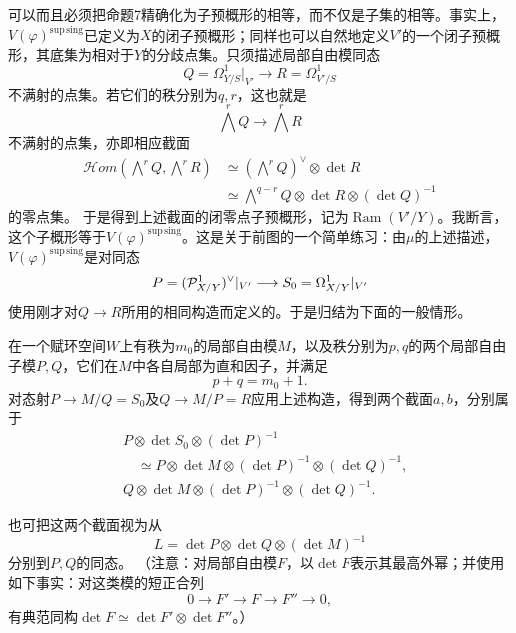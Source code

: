 可以而且必须把命题7精确化为子预概形的相等，而不仅是子集的相等。事实上，$V(\varphi)^{\mathrm{sup\,sing}}$已定义为$X$的闭子预概形；同样也可以自然地定义$V'$的一个闭子预概形，其底集为相对于$Y$的分歧点集。只须描述局部自由模同态
\[
 Q=\Omega^1_{Y/S}|_{V'}\longrightarrow R=\Omega^1_{V'/S}
\]
不满射的点集。若它们的秩分别为$q,r$，这也就是
\[
 \bigwedge^r Q\longrightarrow\bigwedge^r R
\]
不满射的点集，亦即相应截面
\begin{align*}
 \mathscr Hom(\bigwedge^r Q,\bigwedge^r R)
 &\simeq(\bigwedge^r Q)^\vee\otimes\det R\\
 &\simeq\bigwedge^{q-r}Q\otimes\det R\otimes(\det Q)^{-1}
\end{align*}
的零点集。
于是得到上述截面的闭零点子预概形，记为$\operatorname{Ram}(V'/Y)$。我断言，这个子概形等于$V(\varphi)^{\mathrm{sup\,sing}}$。这是关于前图的一个简单练习：由$\mu$的上述描述，$V(\varphi)^{\mathrm{sup\,sing}}$是对同态
\[
 P=(\mathcal P^1_{X/Y})^\vee|_{V'}\longrightarrow
 S_0=\Omega^1_{X/Y}|_{V'}
\]
使用刚才对$Q\to R$所用的相同构造而定义的。于是归结为下面的一般情形。

在一个赋环空间$W$上有秩为$m_0$的局部自由模$M$，以及秩分别为$p,q$的两个局部自由子模$P,Q$，它们在$M$中各自局部为直和因子，并满足
\[
 p+q=m_0+1.
\]
对态射$P\to M/Q=S_0$及$Q\to M/P=R$应用上述构造，得到两个截面$a,b$，分别属于
\begin{align*}
 &P\otimes\det S_0\otimes(\det P)^{-1}\\
 &\quad\simeq P\otimes\det M\otimes(\det P)^{-1}\otimes(\det Q)^{-1},\\
 &Q\otimes\det M\otimes(\det P)^{-1}\otimes(\det Q)^{-1}.
\end{align*}

也可把这两个截面视为从
\[
 L=\det P\otimes\det Q\otimes(\det M)^{-1}
\]
分别到$P,Q$的同态。
（注意：对局部自由模$F$，以$\det F$表示其最高外幂；并使用如下事实：对这类模的短正合列
\[
 0\longrightarrow F'\longrightarrow F\longrightarrow F''\longrightarrow0,
\]
有典范同构$\det F\simeq\det F'\otimes\det F''$。）

